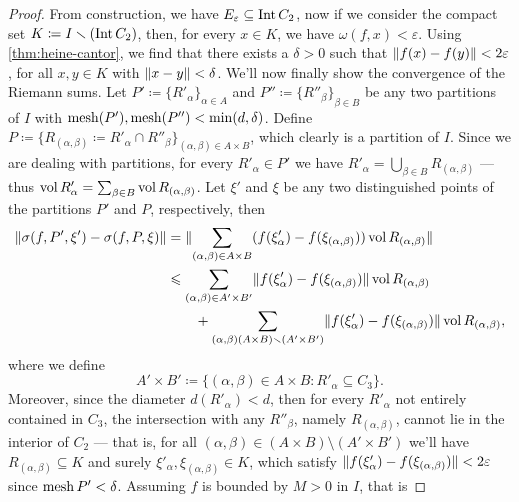 \begin{proof}
    From construction, we have \(E_{\varepsilon} \subseteq \operatorname{Int} C_2\), now if we
    consider the compact set \(K \coloneq I \smallsetminus (\operatorname{Int} C_2)\), then, for every
    \(x \in K\), we have \(\omega(f, x) < \varepsilon\). Using
    \cref{thm:heine-cantor}, we find that there exists a \(\delta > 0\) such that
    \(\lVert f(x) - f(y)\rVert < 2 \varepsilon\), for all \(x, y \in K\) with \(\lVert x -
        y\rVert < \delta\). We'll now finally show the convergence of the Riemann sums. Let
    \(P' \coloneq {\{R'_{\alpha}\}}_{\alpha \in A}\) and \(P'' \coloneq
    {\{R''_{\beta}\}}_{\beta \in B}\) be any two partitions of \(I\) with \(\operatorname{mesh}(P'),
    \operatorname{mesh}(P'') < \min(d, \delta)\). Define \(P \coloneq \{R_{(\alpha, \beta)}
    \coloneq R'_{\alpha} \cap R''_{\beta}\}_{(\alpha, \beta) \in A \times B}\),
    which clearly is a partition of \(I\). Since we are dealing with partitions,
    for every \(R'_{\alpha} \in P'\) we have \(R'_{\alpha} = \bigcup_{\beta \in
        B} R_{(\alpha, \beta)}\) --- thus \(\operatorname{vol} R'_{\alpha} = \sum_{\beta \in B} \operatorname{vol}
    R_{(\alpha, \beta)}\). Let \(\xi'\) and \(\xi\) be any two distinguished points
    of the partitions \(P'\) and \(P\), respectively, then
    \begin{align*}
        \lVert\sigma(f, P', \xi') - \sigma(f, P, \xi)\rVert
         & = \lVert\sum_{(\alpha, \beta) \in A \times B} (f(\xi'_{\alpha}) -
        f(\xi_{(\alpha, \beta)})) \operatorname{vol} R_{(\alpha, \beta)}\rVert                         \\
         & \leqslant \sum_{(\alpha, \beta) \in A' \times B'}
        \lVert f(\xi'_{\alpha}) - f(\xi_{(\alpha, \beta)})\rVert \operatorname{vol} R_{(\alpha, \beta)} \\
         & \qquad+  \sum_{(\alpha, \beta) (A \times B) \smallsetminus (A' \times B')}
        \lVert f(\xi'_{\alpha}) - f(\xi_{(\alpha, \beta)})\rVert \operatorname{vol} R_{(\alpha, \beta)},
    \end{align*}
    where we define
    \[
        A' \times B' \coloneq
        \{(\alpha, \beta) \in A \times B : R'_{\alpha} \subseteq C_3\}.
    \]
    Moreover, since the diameter \(d(R'_{\alpha}) < d\), then for every
    \(R'_{\alpha}\) not entirely contained in \(C_3\), the intersection with any
    \(R''_{\beta}\), namely \(R_{(\alpha, \beta)}\), cannot lie in the interior of
    \(C_2\) --- that is, for all \((\alpha, \beta) \in (A \times B) \setminus (A'
    \times B')\) we'll have \(R_{(\alpha, \beta)} \subseteq K\) and surely
    \(\xi'_{\alpha}, \xi_{(\alpha, \beta)} \in K\), which satisfy
    \(\lVert f(\xi'_{\alpha}) - f(\xi_{(\alpha, \beta)})\rVert < 2 \varepsilon\) since
    \(\operatorname{mesh} P' < \delta\). Assuming \(f\) is bounded by \(M > 0\) in \(I\), that is

\end{proof}
